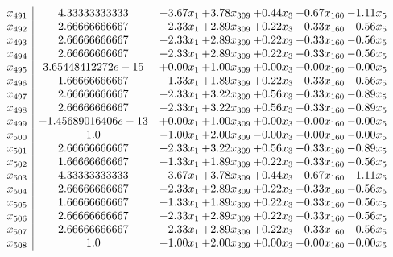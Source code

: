\documentclass[8pt]{article}
\begin{document}
\[\begin{array}{c| c c@{\hskip 2pt} c@{\hskip 2pt} c@{\hskip 2pt} c@{\hskip 2pt} c@{\hskip 2pt} }
 x_{491}   &  4.33333333333 & -3.67 x_{1} & +  3.78 x_{309} & +  0.44 x_{3} & -0.67 x_{160} & -1.11 x_{5}\\
 x_{492}   &  2.66666666667 & -2.33 x_{1} & +  2.89 x_{309} & +  0.22 x_{3} & -0.33 x_{160} & -0.56 x_{5}\\
 x_{493}   &  2.66666666667 & -2.33 x_{1} & +  2.89 x_{309} & +  0.22 x_{3} & -0.33 x_{160} & -0.56 x_{5}\\
 x_{494}   &  2.66666666667 & -2.33 x_{1} & +  2.89 x_{309} & +  0.22 x_{3} & -0.33 x_{160} & -0.56 x_{5}\\
 x_{495}   &  3.65448412272e-15 & +  0.00 x_{1} & +  1.00 x_{309} & +  0.00 x_{3} & -0.00 x_{160} & -0.00 x_{5}\\
 x_{496}   &  1.66666666667 & -1.33 x_{1} & +  1.89 x_{309} & +  0.22 x_{3} & -0.33 x_{160} & -0.56 x_{5}\\
 x_{497}   &  2.66666666667 & -2.33 x_{1} & +  3.22 x_{309} & +  0.56 x_{3} & -0.33 x_{160} & -0.89 x_{5}\\
 x_{498}   &  2.66666666667 & -2.33 x_{1} & +  3.22 x_{309} & +  0.56 x_{3} & -0.33 x_{160} & -0.89 x_{5}\\
 x_{499}   &  -1.45689016406e-13 & +  0.00 x_{1} & +  1.00 x_{309} & +  0.00 x_{3} & -0.00 x_{160} & -0.00 x_{5}\\
 x_{500}   &  1.0 & -1.00 x_{1} & +  2.00 x_{309} & -0.00 x_{3} & -0.00 x_{160} & -0.00 x_{5}\\
 x_{501}   &  2.66666666667 & -2.33 x_{1} & +  3.22 x_{309} & +  0.56 x_{3} & -0.33 x_{160} & -0.89 x_{5}\\
 x_{502}   &  1.66666666667 & -1.33 x_{1} & +  1.89 x_{309} & +  0.22 x_{3} & -0.33 x_{160} & -0.56 x_{5}\\
 x_{503}   &  4.33333333333 & -3.67 x_{1} & +  3.78 x_{309} & +  0.44 x_{3} & -0.67 x_{160} & -1.11 x_{5}\\
 x_{504}   &  2.66666666667 & -2.33 x_{1} & +  2.89 x_{309} & +  0.22 x_{3} & -0.33 x_{160} & -0.56 x_{5}\\
 x_{505}   &  1.66666666667 & -1.33 x_{1} & +  1.89 x_{309} & +  0.22 x_{3} & -0.33 x_{160} & -0.56 x_{5}\\
 x_{506}   &  2.66666666667 & -2.33 x_{1} & +  2.89 x_{309} & +  0.22 x_{3} & -0.33 x_{160} & -0.56 x_{5}\\
 x_{507}   &  2.66666666667 & -2.33 x_{1} & +  2.89 x_{309} & +  0.22 x_{3} & -0.33 x_{160} & -0.56 x_{5}\\
 x_{508}   &  1.0 & -1.00 x_{1} & +  2.00 x_{309} & +  0.00 x_{3} & -0.00 x_{160} & -0.00 x_{5}\\

\end{array}\]
\end{document}
